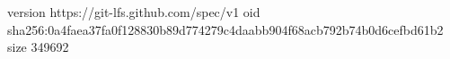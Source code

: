 version https://git-lfs.github.com/spec/v1
oid sha256:0a4faea37fa0f128830b89d774279c4daabb904f68acb792b74b0d6cefbd61b2
size 349692
